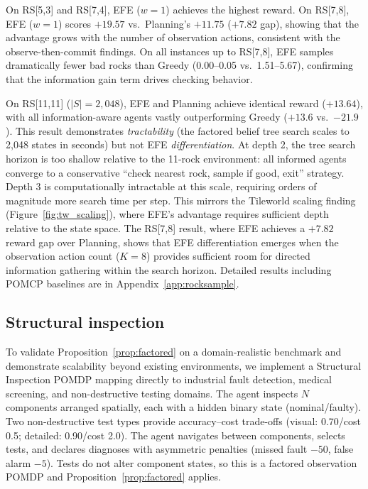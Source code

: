 \documentclass{article}
\begin{document}
On RS[5,3] and RS[7,4], EFE ($w{=}1$) achieves the highest reward. On RS[7,8], EFE ($w{=}1$) scores $+19.57$ vs.\ Planning's $+11.75$ ($+7.82$ gap), showing that the advantage grows with the number of observation actions, consistent with the observe-then-commit findings. On all instances up to RS[7,8], EFE samples dramatically fewer bad rocks than Greedy (0.00--0.05 vs.\ 1.51--5.67), confirming that the information gain term drives checking behavior.

On RS[11,11] ($|S|{=}2{,}048$), EFE and Planning achieve identical reward ($+13.64$), with all information-aware agents vastly outperforming Greedy ($+13.6$ vs.\ $-21.9$). This result demonstrates \emph{tractability} (the factored belief tree search scales to 2{,}048 states in seconds) but not EFE \emph{differentiation}. At depth 2, the tree search horizon is too shallow relative to the 11-rock environment: all informed agents converge to a conservative ``check nearest rock, sample if good, exit'' strategy. Depth 3 is computationally intractable at this scale, requiring orders of magnitude more search time per step. This mirrors the Tileworld scaling finding (Figure~\ref{fig:tw_scaling}), where EFE's advantage requires sufficient depth relative to the state space. The RS[7,8] result, where EFE achieves a $+7.82$ reward gap over Planning, shows that EFE differentiation emerges when the observation action count ($K{=}8$) provides sufficient room for directed information gathering within the search horizon. Detailed results including POMCP baselines are in Appendix~\ref{app:rocksample}.

\subsection{Structural inspection}
\label{sec:inspection}

To validate Proposition~\ref{prop:factored} on a domain-realistic benchmark and demonstrate scalability beyond existing environments, we implement a Structural Inspection POMDP mapping directly to industrial fault detection, medical screening, and non-destructive testing domains. The agent inspects $N$ components arranged spatially, each with a hidden binary state (nominal/faulty). Two non-destructive test types provide accuracy--cost trade-offs (visual: 0.70/cost 0.5; detailed: 0.90/cost 2.0). The agent navigates between components, selects tests, and declares diagnoses with asymmetric penalties (missed fault $-50$, false alarm $-5$). Tests do not alter component states, so this is a factored observation POMDP and Proposition~\ref{prop:factored} applies.
\end{document}
